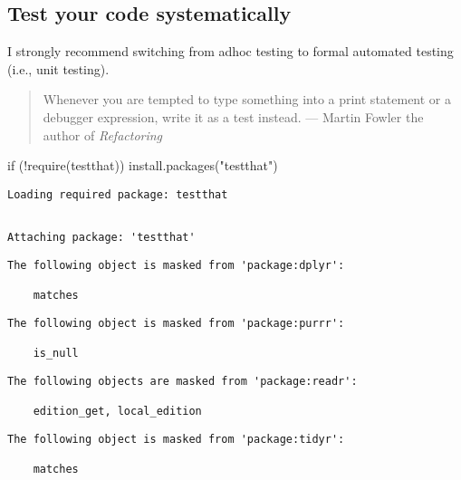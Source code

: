 \documentclass[
  letterpaper,
  DIV=11,
  numbers=noendperiod]{scrreprt}
\newenvironment{Shaded}{\begin{snugshade}}{\end{snugshade}}
\newcommand{\ControlFlowTok}[1]{\textcolor[rgb]{0.00,0.23,0.31}{#1}}
\newcommand{\FunctionTok}[1]{\textcolor[rgb]{0.28,0.35,0.67}{#1}}
\newcommand{\NormalTok}[1]{\textcolor[rgb]{0.00,0.23,0.31}{#1}}
\newcommand{\SpecialCharTok}[1]{\textcolor[rgb]{0.37,0.37,0.37}{#1}}
\newcommand{\StringTok}[1]{\textcolor[rgb]{0.13,0.47,0.30}{#1}}
\begin{document}
\hypertarget{test-your-code-systematically}{%
\subsection*{Test your code
systematically}\label{test-your-code-systematically}}

I strongly recommend switching from adhoc testing to formal automated
testing (i.e., unit testing).

\begin{quote}
Whenever you are tempted to type something into a print statement or a
debugger expression, write it as a test instead. --- Martin Fowler the
author of \emph{Refactoring}
\end{quote}

\begin{Shaded}
\begin{Highlighting}[]
\ControlFlowTok{if}\NormalTok{ (}\SpecialCharTok{!}\FunctionTok{require}\NormalTok{(testthat)) }\FunctionTok{install.packages}\NormalTok{(}\StringTok{"testthat"}\NormalTok{)}
\end{Highlighting}
\end{Shaded}

\begin{verbatim}
Loading required package: testthat
\end{verbatim}

\begin{verbatim}

Attaching package: 'testthat'
\end{verbatim}

\begin{verbatim}
The following object is masked from 'package:dplyr':

    matches
\end{verbatim}

\begin{verbatim}
The following object is masked from 'package:purrr':

    is_null
\end{verbatim}

\begin{verbatim}
The following objects are masked from 'package:readr':

    edition_get, local_edition
\end{verbatim}

\begin{verbatim}
The following object is masked from 'package:tidyr':

    matches
\end{verbatim}
\end{document}

